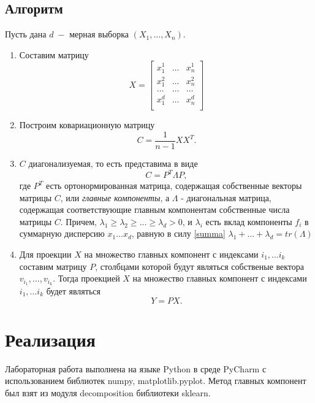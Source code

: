 \documentclass[a4paper]{article}
\begin{document}
\subsection{Алгоритм}
Пусть дана $d\;-$ мерная выборка $\left(X_1,\hdots,X_n\right)$. 
\begin{enumerate}
    \item  Составим матрицу
\begin{equation}
    X=\begin{bmatrix}
    x_1^1&\hdots&x_n^1\\
    x_1^2&\hdots&x_n^2\\
    \hdots&\hdots&\hdots\\
    x_1^d&\hdots&x_n^d\\
    \end{bmatrix}
\end{equation}
    \item Построим ковариационную матрицу
    \begin{equation}
        C=\dfrac{1}{n-1}XX^T.
    \end{equation}
    \item $C$ диагонализуемая, то есть представима в виде
    \begin{equation}
        C = P^T \Lambda P,
    \end{equation}
    где $P^T$ есть ортонормированная матрица, содержащая собственные векторы матрицы $C$, или \textit{главные компоненты}, а $\Lambda$ - диагональная матрица, содержащая соответствующие главным компонентам собственные числа матрицы $C$. Причем, $\lambda_1 \geq \lambda_2 \geq ... \geq \lambda_d > 0$, и $\lambda_i$ есть вклад компоненты $f_i$ в суммарную дисперсию $x_1 ... x_d$, равную в силу \eqref{summa} $\lambda_1 + ... + \lambda_d  = tr(\Lambda)$
    \item Для проекции $X$ на множество главных компонент с индексами $i_1,...i_k$ составим матрицу $P$, столбцами которой будут являться собственые вектора $v_{i_1},...,v_{i_k}$. Тогда проекцией $X$ на множество главных компонент с индексами $i_1,...i_k$ будет являться
    \begin{equation}
        Y=PX.
    \end{equation}
\end{enumerate}

\section{Реализация}
Лабораторная работа выполнена на языке Python в среде PyCharm с использованием библиотек numpy, matplotlib.pyplot. Метод главных компонент был взят из модуля decomposition библиотеки sklearn.
\end{document}
